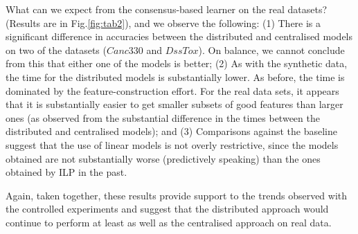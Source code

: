 What can we expect from the consensus-based learner on the real datasets? (Results are in Fig.\ref{fig:tab2}),
and we observe the following:
(1) There is a significant difference in accuracies between the distributed and
    centralised models on two of the datasets ($Canc330$ and $DssTox$). On balance,
    we cannot conclude from this that either one of the models is better;
(2) As with the synthetic data, the time for the distributed models is substantially lower.
    As before, the time is dominated by the feature-construction effort. For the real data sets,
    it appears that it is substantially easier to get smaller subsets of good features than larger ones
    (as observed from the substantial difference in the times between the distributed and centralised models); and
(3) Comparisons against the baseline suggest that the use of linear models is not overly restrictive, since the
    models obtained are not substantially worse (predictively speaking) than the ones obtained by ILP in the past.

Again, taken together, these results provide support to the trends observed with the controlled experiments and
suggest that the distributed approach would continue to perform at least as well as the centralised approach
on real data.



